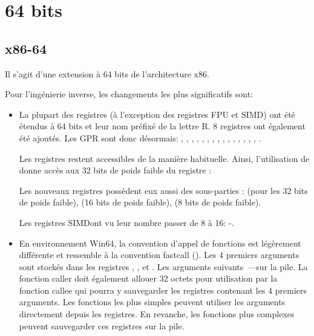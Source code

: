 \section{64 bits}

\subsection{x86-64}
\label{x86-64}

Il s'agit d'une extension à 64 bits de l'architecture x86.

Pour l'ingénierie inverse, les changements les plus significatifs sont:

\myindex{\CLanguageElements!\Pointers}
\begin{itemize}

\item

La plupart des registres (à l'exception des registres FPU et SIMD) ont été étendus à 64 bits et 
leur nom préfixé de la lettre R. 8 registres ont également été ajoutés.
Les \ac{GPR} sont donc désormais: \RAX, \RBX, \RCX, \RDX, 
\RBP, \RSP, \RSI, \RDI, , , , 
, , , , . 

Les  registres restent accessibles de la manière habituelle. Ainsi, l'utilisation de 
\EAX donne accès aux 32 bits de poids faible du registre \RAX:


Les nouveaux registres  possèdent eux aussi des sous-parties :  
(pour les 32 bits de poids faible),  (16 bits de poids faible),  
(8 bits de poids faible).


Les registres SIMDont vu leur nombre passer de 8 à 16: -.

\item

En environnement Win64, la convention d'appel de fonctions est légèrement différente et ressemble 
à la convention fastcall ().
Les 4 premiers arguments sont stockés dans les registres \RCX, \RDX,  et . Les 
arguments suivants~---sur la pile.
La fonction \gls{caller} doit également allouer 32 octets pour utilisation par la fonction 
\gls{callee} qui pourra y sauvegarder les registres contenant les 4 premiers arguments.
Les fonctions les plus simples peuvent utiliser les arguments directement depuis les registres. 
En revanche, les fonctions plus complexes peuvent sauvegarder ces registres sur la pile.


\end{itemize}

